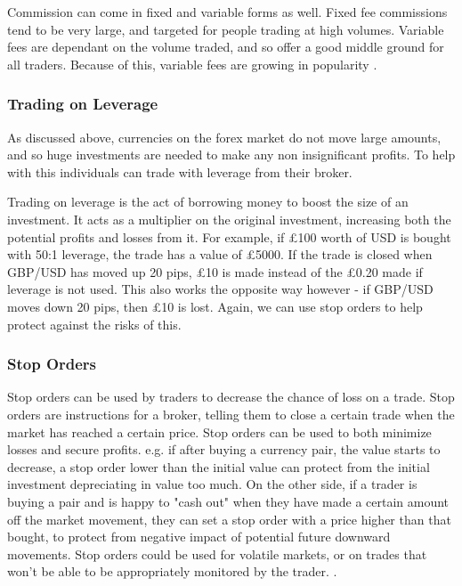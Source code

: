             Commission can come in fixed and variable forms as well. Fixed fee commissions tend to be very large, and targeted for people trading at high volumes. Variable fees are dependant on the volume traded, and so offer a good middle ground for all traders. Because of this, variable fees are growing in popularity \cite{llc_2016}. 



            \subsubsection{Trading on Leverage}
            As discussed above, currencies on the forex market do not move large amounts, and so huge investments are needed to make any non insignificant profits. To help with this individuals can trade with leverage from their broker. 
                        
            Trading on leverage is the act of borrowing money to boost the size of an investment. It acts as a multiplier on the original investment, increasing both the potential profits and losses from it. For example, if £100 worth of USD is bought with 50:1 leverage, the trade has a value of £5000. If the trade is closed when GBP/USD has moved up 20 pips, £10 is made instead of the £0.20 made if leverage is not used. \cite{lioudis_2018}This also works the opposite way however - if GBP/USD moves down 20 pips, then £10 is lost. Again, we can use stop orders to help protect against the risks of this. 


            \subsubsection{Stop Orders}
            Stop orders can be used by traders to decrease the chance of loss on a trade. Stop orders are instructions for a broker, telling them to close a certain trade when the market has reached a certain price. Stop orders can be used to both minimize losses and secure profits. e.g. if after buying a currency pair, the value starts to decrease, a stop order lower than the initial value can protect from the initial investment depreciating in value too much. On the other side, if a trader is buying a pair and is happy to "cash out" when they have made a certain amount off the market movement, they can set a stop order with a price higher than that bought, to protect from negative impact of potential future downward movements. Stop orders could be used for volatile markets, or on trades that won't be able to be appropriately monitored by the trader. \cite{momoh_2018}.

